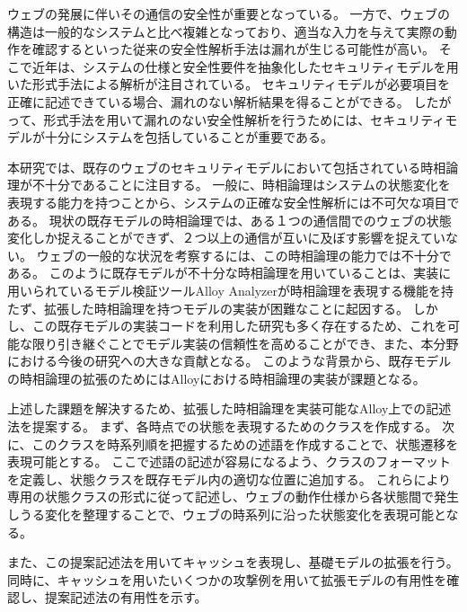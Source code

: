 \documentclass[12pt,a4paper]{jbook}
\begin{document}
ウェブの発展に伴いその通信の安全性が重要となっている。
一方で、ウェブの構造は一般的なシステムと比べ複雑となっており、適当な入力を与えて実際の動作を確認するといった従来の安全性解析手法は漏れが生じる可能性が高い。
そこで近年は、システムの仕様と安全性要件を抽象化したセキュリティモデルを用いた形式手法による解析が注目されている。
セキュリティモデルが必要項目を正確に記述できている場合、漏れのない解析結果を得ることができる。
したがって、形式手法を用いて漏れのない安全性解析を行うためには、セキュリティモデルが十分にシステムを包括していることが重要である。

本研究では、既存のウェブのセキュリティモデルにおいて包括されている時相論理が不十分であることに注目する。
一般に、時相論理はシステムの状態変化を表現する能力を持つことから、システムの正確な安全性解析には不可欠な項目である。
現状の既存モデルの時相論理では、ある１つの通信間でのウェブの状態変化しか捉えることができず、２つ以上の通信が互いに及ぼす影響を捉えていない。
ウェブの一般的な状況を考察するには、この時相論理の能力では不十分である。
このように既存モデルが不十分な時相論理を用いていることは、実装に用いられているモデル検証ツールAlloy Analyzerが時相論理を表現する機能を持たず、拡張した時相論理を持つモデルの実装が困難なことに起因する。
しかし、この既存モデルの実装コードを利用した研究も多く存在するため、これを可能な限り引き継ぐことでモデル実装の信頼性を高めることができ、また、本分野における今後の研究への大きな貢献となる。
このような背景から、既存モデルの時相論理の拡張のためにはAlloyにおける時相論理の実装が課題となる。

上述した課題を解決するため、拡張した時相論理を実装可能なAlloy上での記述法を提案する。
まず、各時点での状態を表現するためのクラスを作成する。
次に、このクラスを時系列順を把握するための述語を作成することで、状態遷移を表現可能とする。
ここで述語の記述が容易になるよう、クラスのフォーマットを定義し、状態クラスを既存モデル内の適切な位置に追加する。
これらにより専用の状態クラスの形式に従って記述し、ウェブの動作仕様から各状態間で発生しうる変化を整理することで、ウェブの時系列に沿った状態変化を表現可能となる。

また、この提案記述法を用いてキャッシュを表現し、基礎モデルの拡張を行う。
同時に、キャッシュを用いたいくつかの攻撃例を用いて拡張モデルの有用性を確認し、提案記述法の有用性を示す。
\end{document}
